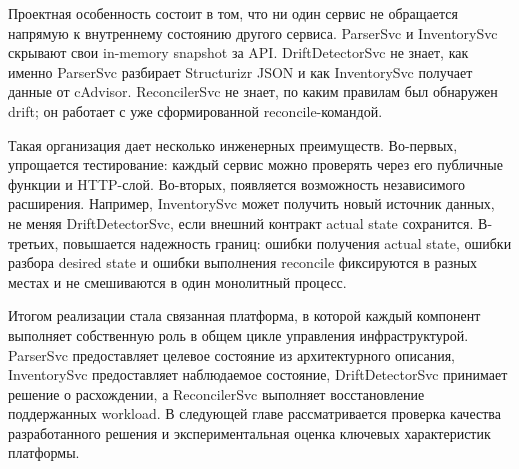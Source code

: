 Проектная особенность состоит в том, что ни один сервис не обращается напрямую к внутреннему состоянию другого сервиса. ParserSvc и InventorySvc скрывают свои in-memory snapshot за API. DriftDetectorSvc не знает, как именно ParserSvc разбирает Structurizr JSON и как InventorySvc получает данные от cAdvisor. ReconcilerSvc не знает, по каким правилам был обнаружен drift; он работает с уже сформированной reconcile-командой.

Такая организация дает несколько инженерных преимуществ. Во-первых, упрощается тестирование: каждый сервис можно проверять через его публичные функции и HTTP-слой. Во-вторых, появляется возможность независимого расширения. Например, InventorySvc может получить новый источник данных, не меняя DriftDetectorSvc, если внешний контракт actual state сохранится. В-третьих, повышается надежность границ: ошибки получения actual state, ошибки разбора desired state и ошибки выполнения reconcile фиксируются в разных местах и не смешиваются в один монолитный процесс.

Итогом реализации стала связанная платформа, в которой каждый компонент выполняет собственную роль в общем цикле управления инфраструктурой. ParserSvc предоставляет целевое состояние из архитектурного описания, InventorySvc предоставляет наблюдаемое состояние, DriftDetectorSvc принимает решение о расхождении, а ReconcilerSvc выполняет восстановление поддержанных workload. В следующей главе рассматривается проверка качества разработанного решения и экспериментальная оценка ключевых характеристик платформы.
